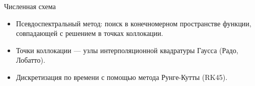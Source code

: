 \documentclass[usenames,dvipsnames]{beamer}
\begin{document}
\begin{frame}{Численная схема}
\begin{minipage}{\textwidth}
\begin{itemize}
	\item Псевдоспектральный метод: поиск в конечномерном пространстве функции, совпадающей с решением в точках коллокации.
	\item Точки коллокации --- узлы интерполяционной квадратуры Гаусса (Радо, Лобатто).
	\item Дискретизация по времени с помощью метода Рунге-Кутты (RK45).
\end{itemize}
\end{minipage}

\end{frame}
\end{document}
